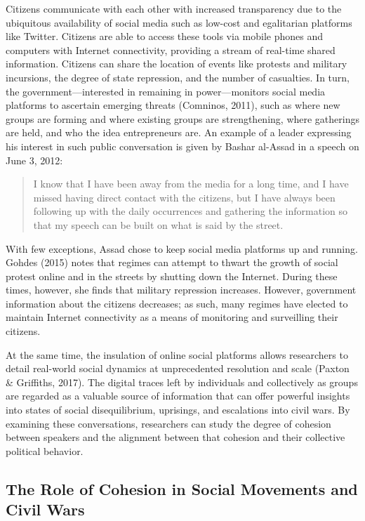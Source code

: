 \documentclass[
  english,
  man]{apa6}
\begin{document}
Citizens communicate with each other with increased transparency due to the
ubiquitous availability of social media such as low-cost and egalitarian
platforms like Twitter. Citizens are able to access these tools via mobile
phones and computers with Internet connectivity, providing a stream of real-time
shared information. Citizens can share the location of events like protests and military
incursions, the degree of state repression, and the number of casualties. In
turn, the government---interested in remaining in power---monitors social media
platforms to ascertain emerging threats (Comninos, 2011),
such as where new groups are forming
and where existing groups are strengthening, where gatherings are held, and who
the idea entrepreneurs are. An example of a leader
expressing his interest in
such public conversation is given by Bashar al-Assad in a speech on June 3, 2012:

\begin{quote}
I know that I have been away from the media for a long time, and I have missed
having direct contact with the citizens, but I have always been following up
with the daily occurrences and gathering the information so that my speech can
be built on what is said by the street.
\end{quote}

With few exceptions, Assad chose to keep social media platforms up and running.
Gohdes (2015) notes that regimes can attempt to thwart the growth of social
protest online and in the streets by shutting down the Internet.
During these times, however, she finds that military repression increases.
However, government information about the citizens decreases; as such, many
regimes have elected to maintain Internet connectivity as a means of monitoring
and surveilling their citizens.

At the same time, the insulation
of online social platforms allows researchers to detail real-world social dynamics
at unprecedented resolution and scale (Paxton \& Griffiths, 2017). The digital traces left by
individuals and collectively as groups are regarded as a valuable source of
information that can offer powerful insights into states of social
disequilibrium, uprisings, and escalations into civil wars.
By examining these conversations, researchers can study the degree of cohesion between
speakers and the alignment between that cohesion and their collective political
behavior.

\hypertarget{the-role-of-cohesion-in-social-movements-and-civil-wars}{%
\subsection{The Role of Cohesion in Social Movements and Civil Wars}\label{the-role-of-cohesion-in-social-movements-and-civil-wars}}
\end{document}
